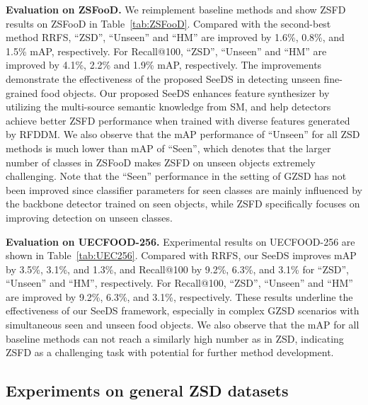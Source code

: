 \noindent\textbf{Evaluation on ZSFooD.}
We reimplement baseline methods and show ZSFD results on ZSFooD in Table~\ref{tab:ZSFooD}. Compared with the second-best method RRFS, ``ZSD'', ``Unseen'' and ``HM'' are improved by 1.6\%, 0.8\%, and 1.5\% mAP, respectively. For Recall@100, ``ZSD'', ``Unseen'' and ``HM'' are improved by 4.1\%, 2.2\% and 1.9\% mAP, respectively. The improvements demonstrate the effectiveness of the proposed SeeDS in detecting unseen fine-grained food objects. Our proposed SeeDS enhances feature synthesizer by utilizing the multi-source semantic knowledge from SM, and help detectors achieve better ZSFD performance when trained with diverse features generated by RFDDM. We also observe that the mAP performance of ``Unseen'' for all ZSD methods is much lower than mAP of ``Seen'', which denotes that the larger number of classes in ZSFooD makes ZSFD on unseen objects extremely challenging. Note that the ``Seen'' performance in the setting of GZSD has not been improved since classifier parameters for seen classes are mainly influenced by the backbone detector trained on seen objects, while ZSFD specifically focuses on improving detection on unseen classes.

\noindent\textbf{Evaluation on UECFOOD-256.} 
Experimental results on UECFOOD-256 are shown in Table~\ref{tab:UEC256}. Compared with RRFS, our SeeDS improves mAP by 3.5\%, 3.1\%, and 1.3\%, and Recall@100 by 9.2\%, 6.3\%, and 3.1\% for ``ZSD'', ``Unseen'' and ``HM'', respectively. For Recall@100, ``ZSD'', ``Unseen'' and ``HM'' are improved by 9.2\%, 6.3\%, and 3.1\%, respectively. These results underline the effectiveness of our SeeDS framework, especially in complex GZSD scenarios with simultaneous seen and unseen food objects. We also observe that the mAP for all baseline methods can not reach a similarly high number as in ZSD, indicating ZSFD as a challenging task with potential for further method development.

\subsection{Experiments on general ZSD datasets}

